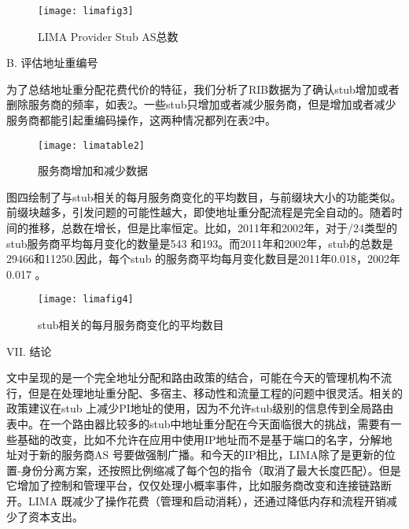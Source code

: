 \begin{figure}
  \centering
  \texttt{[image: limafig3]}\\
  \caption{LIMA Provider Stub AS总数}\label{fig:limafig3}
\end{figure}

\begin{flushleft}
B.	评估地址重编号
\end{flushleft}
\par 为了总结地址重分配花费代价的特征，我们分析了RIB数据为了确认stub增加或者删除服务商的频率，如表2。一些stub只增加或者减少服务商，但是增加或者减少服务商都能引起重编码操作，这两种情况都列在表2中。

\begin{figure}
  \centering
  \texttt{[image: limatable2]}\\
  \caption{服务商增加和减少数据}\label{fig:limatable2}
\end{figure}

\par 图四绘制了与stub相关的每月服务商变化的平均数目，与前缀块大小的功能类似。前缀块越多，引发问题的可能性越大，即使地址重分配流程是完全自动的。随着时间的推移，总数在增长，但是比率恒定。比如，2011年和2002年，对于/24类型的stub服务商平均每月变化的数量是543 和193。而2011年和2002年，stub的总数是29466和11250.因此，每个stub 的服务商平均每月变化数目是2011年0.018，2002年0.017 。

\begin{figure}
  \centering
  \texttt{[image: limafig4]}\\
  \caption{stub相关的每月服务商变化的平均数目}\label{fig:limafig4}
\end{figure}

\begin{center}
VII.	结论 
\end{center}
\par 文中呈现的是一个完全地址分配和路由政策的结合，可能在今天的管理机构不流行，但是在处理地址重分配、多宿主、移动性和流量工程的问题中很灵活。相关的政策建议在stub 上减少PI地址的使用，因为不允许stub级别的信息传到全局路由表中。在一个路由器比较多的stub中地址重分配在今天面临很大的挑战，需要有一些基础的改变，比如不允许在应用中使用IP地址而不是基于端口的名字，分解地址对于新的服务商AS 号要做强制广播。和今天的IP相比，LIMA除了是更新的位置-身份分离方案，还按照比例缩减了每个包的指令（取消了最大长度匹配）。但是它增加了控制和管理平台，仅仅处理小概率事件，比如服务商改变和连接链路断开。LIMA 既减少了操作花费（管理和启动消耗），还通过降低内存和流程开销减少了资本支出。




